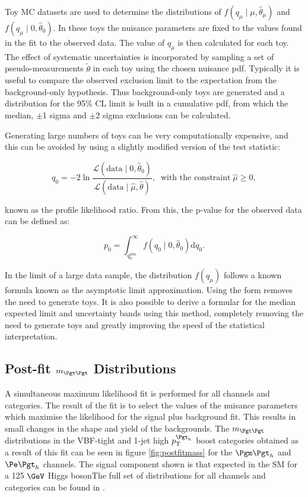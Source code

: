 Toy \ac{MC} datasets are used to determine the distributions of 
$f(q_{\mu}\mid\mu,\hat{\theta}_{\mu})$ and $f(q_{\mu}\mid0,\hat{\theta}_{0})$.
In these toys the nuisance parameters are
fixed to the values found in the fit to the observed data. The value of
$q_{\mu}$ is then calculated for each toy. The effect of systematic
uncertainties is incorporated by sampling a set of pseudo-measurements
$\tilde{\theta}$ in each toy using the chosen nuisance \ac{pdf}.
Typically it is useful to compare the observed exclusion limit to the expectation 
from the background-only hypothesis. Thus background-only toys are generated and
a distribution for the 95\% CL limit is built in a cumulative \ac{pdf}, from
which the median, $\pm$1 sigma and $\pm$2 sigma exclusions can be calculated.

Generating large numbers of toys can be very computationally expensive, and this
can be avoided by using a slightly modified version of the test statistic:

\begin{equation}
q_{0} = -2
\ln\frac{\mathcal{L}(\mathrm{data}\mid0,\hat{\theta}_{0})}{\mathcal{L}(\mathrm{data}\mid\hat{\mu},\hat{\theta})},
\;\; \text{with the constraint} \; \hat{\mu}\geq 0,
\end{equation}

known as the profile likelihood ratio. From this, the p-value for the observed
data can be defined as:

\begin{equation}
p_{0} =
\int_{q_{0}^{\mathrm{obs}}}^{\infty}f(q_{0}\mid0,\hat{\theta}_{0})\mathrm{d}q_{0}
.
\end{equation}

In the limit of a large data sample, the distribution $f(q_{\mu})$ follows a known formula
\cite{Cowan:2011aa} known as the asymptotic limit approximation. Using the form
removes the need to generate toys. It is also possible to derive a formular for
the median expected limit and uncertainty bands using this method, completely
removing the need to generate toys and greatly improving the speed of the
statistical interpretation.

\subsection{Post-fit $m_{\Pgt\Pgt}$ Distributions}

A simultaneous maximum likelihood fit is performed for all channels and
categories. The result of the fit is to select the values of the nuisance
parameters which maximise the likelihood for the signal plus background fit.
This results in small changes in the shape and yield of the backgrounds. The
$m_{\Pgt\Pgt}$ distributions in the VBF-tight and 1-jet high $\pt^{\Pgt_{h}}$
boost categories obtained as a result of this fit can be seen in
figure \ref{fig:postfitmass} for the $\mutau$ and $\etau$ channels. The signal
component shown is that expected in the \ac{SM} for a 125 $\GeV$ Higgs bosonThe full set
of distributions for all channels and categories can be found in
\cite{HIG-13-004}.

